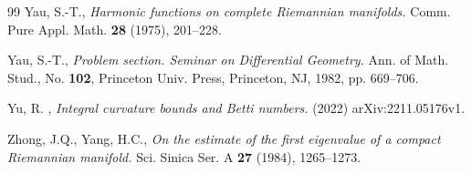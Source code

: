 \documentclass[12pt, twoside]{article}
\theoremstyle{definition}
\numberwithin{equation}{section}
\begin{document}
\begin{thebibliography}{99}
		Yau, S.-T., \emph{Harmonic functions on complete Riemannian manifolds.} Comm. Pure Appl. Math. \textbf{28} (1975), 201--228.
		
		Yau, S.-T.,
		\emph{Problem section. Seminar on Differential Geometry.} 
		Ann. of Math. Stud., No. \textbf{102}, Princeton Univ. Press, Princeton, NJ, 1982, pp. 669–706. 
		
		
		Yu, R. , \emph{Integral curvature bounds and Betti numbers.} (2022) arXiv:2211.05176v1.
		
	Zhong, J.Q., Yang, H.C., \emph{On the estimate of the first eigenvalue of a compact Riemannian manifold.} Sci. Sinica Ser. A \textbf{27} (1984), 1265--1273.
		
	\end{thebibliography}
\end{document}
